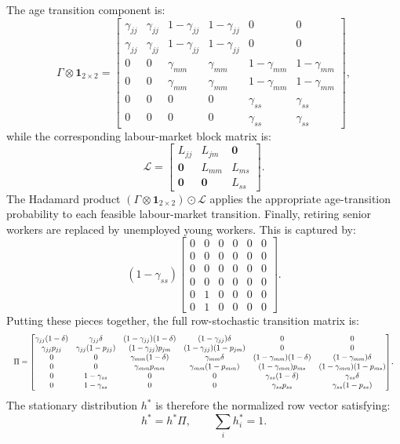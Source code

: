 \documentclass{article}
\begin{document}
The age transition component is:
\[
\Gamma\otimes \mathbf 1_{2\times2}
=
\begin{bmatrix}
\gamma_{jj} & \gamma_{jj} & 1-\gamma_{jj} & 1-\gamma_{jj} & 0 & 0\\
\gamma_{jj} & \gamma_{jj} & 1-\gamma_{jj} & 1-\gamma_{jj} & 0 & 0\\
0 & 0 & \gamma_{mm} & \gamma_{mm} & 1-\gamma_{mm} & 1-\gamma_{mm}\\
0 & 0 & \gamma_{mm} & \gamma_{mm} & 1-\gamma_{mm} & 1-\gamma_{mm}\\
0 & 0 & 0 & 0 & \gamma_{ss} & \gamma_{ss}\\
0 & 0 & 0 & 0 & \gamma_{ss} & \gamma_{ss}
\end{bmatrix},
\]
while the corresponding labour-market block matrix is:
\[
\mathcal L
=
\begin{bmatrix}
L_{jj} & L_{jm} & \mathbf 0\\
\mathbf 0 & L_{mm} & L_{ms}\\
\mathbf 0 & \mathbf 0 & L_{ss}
\end{bmatrix}.
\]
The Hadamard product $(\Gamma\otimes \mathbf 1_{2\times2})\odot\mathcal L$ applies the appropriate age-transition probability to each feasible labour-market transition. Finally, retiring senior workers are replaced by unemployed young workers. This is captured by:
\[
(1-\gamma_{ss})
\begin{bmatrix}
0 & 0 & 0 & 0 & 0 & 0\\
0 & 0 & 0 & 0 & 0 & 0\\
0 & 0 & 0 & 0 & 0 & 0\\
0 & 0 & 0 & 0 & 0 & 0\\
0 & 1 & 0 & 0 & 0 & 0\\
0 & 1 & 0 & 0 & 0 & 0
\end{bmatrix}.
\]
Putting these pieces together, the full row-stochastic transition matrix is:
\[
\resizebox{\textwidth}{!}{$
\Pi=
\begin{bmatrix}
\gamma_{jj}(1-\delta) & \gamma_{jj}\delta
& (1-\gamma_{jj})(1-\delta) & (1-\gamma_{jj})\delta
& 0 & 0\\
\gamma_{jj}p_{jj} & \gamma_{jj}(1-p_{jj})
& (1-\gamma_{jj})p_{jm} & (1-\gamma_{jj})(1-p_{jm})
& 0 & 0\\
0 & 0
& \gamma_{mm}(1-\delta) & \gamma_{mm}\delta
& (1-\gamma_{mm})(1-\delta) & (1-\gamma_{mm})\delta\\
0 & 0
& \gamma_{mm}p_{mm} & \gamma_{mm}(1-p_{mm})
& (1-\gamma_{mm})p_{ms} & (1-\gamma_{mm})(1-p_{ms})\\
0 & 1-\gamma_{ss}
& 0 & 0
& \gamma_{ss}(1-\delta) & \gamma_{ss}\delta\\
0 & 1-\gamma_{ss}
& 0 & 0
& \gamma_{ss}p_{ss} & \gamma_{ss}(1-p_{ss})
\end{bmatrix}
$}.
\]
The stationary distribution $h^*$ is therefore the normalized row vector satisfying:
\[
h^*=h^*\Pi,
\qquad
\sum_i h_i^*=1.
\]
\end{document}
